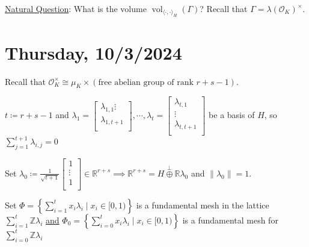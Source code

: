 \documentclass[openany]{amsbook}
\numberwithin{section}{chapter}
\theoremstyle{definition}
\begin{document}
\underline{Natural Question}: What is the volume \(\operatorname{vol}_{\langle \cdot,\cdot \rangle_H}(\Gamma)\)? Recall that \(\Gamma = \lambda (\mathcal{O}_K)^\times\). 

\section*{Thursday, 10/3/2024}

Recall that \(\mathcal{O}_K^\times \cong \mu_K \times (\text{free abelian group of rank } r+s-1)\).


\begin{center}
\end{center}

\(t\coloneqq r+s-1\) and \(\lambda_1 = \begin{bmatrix}
     \lambda_{1,1}
     \vdots \\
     \lambda_{1,t+1} \\
\end{bmatrix}, \cdots , \lambda _t = \begin{bmatrix}
     \lambda_{t,1} \\
     \vdots \\
     \lambda_{t,t+1} \\
\end{bmatrix}\) be a basis of \(H\), so \(\sum_{j=1}^{t+1} \lambda_{i,j} = 0 \)  

Set \(\lambda_0 \coloneqq \frac{1}{\sqrt{t+1}} \begin{bmatrix}
     1 \\
     \vdots \\
     1 \\
\end{bmatrix} \in \mathbb{R}^{r+s} \implies \mathbb{R}^{r+s} = H \overset{\perp}{\oplus} \mathbb{R} \lambda_0\) and \(\lVert \lambda_0 \rVert = 1\).

Set \(\Phi = \left\{ \sum_{i=1} ^ t x_i \lambda_i \mid x_i \in [0,1) \right\} \) is a fundamental mesh in the lattice \(\sum_{i=1}^t \mathbb{Z} \lambda_i\) \underline{and} \(\Phi_0 = \left\{ \sum_{i=0} ^ t x_i \lambda_i \mid x_i \in [0,1) \right\} \) is a fundamental mesh for \(\sum_{i=0} ^ t \mathbb{Z} \lambda_i\) 
\end{document}

